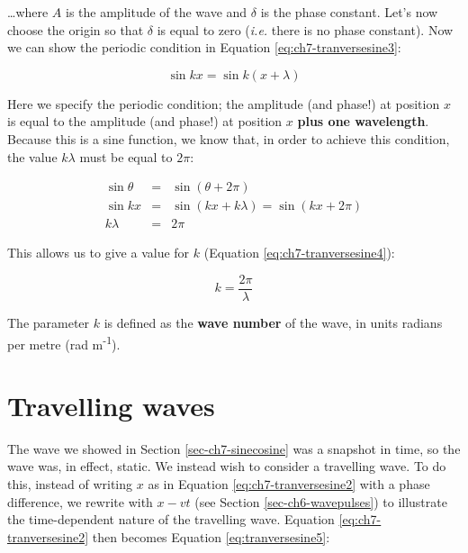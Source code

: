 \documentclass[
]{book}
\begin{document}
\ldots where \(A\) is the amplitude of the wave and \(\delta\) is the phase constant. Let's now choose the origin so that \(\delta\) is equal to zero (\emph{i.e.} there is no phase constant). Now we can show the periodic condition in Equation \eqref{eq:ch7-tranversesine3}:

\begin{equation}
\sin kx = \sin k(x+\lambda)
\label{eq:ch7-tranversesine3}
\end{equation}

Here we specify the periodic condition; the amplitude (and phase!) at position \(x\) is equal to the amplitude (and phase!) at position \(x\) \textbf{plus one wavelength}. Because this is a sine function, we know that, in order to achieve this condition, the value \(k\lambda\) must be equal to \(2\pi\):

\begin{equation}
\begin{array}{rcl}
\sin \theta &=& \sin \left( \theta + 2\pi \right)\\
\sin kx &=& \sin \left( kx + k\lambda\right) = \sin \left( kx + 2\pi \right) \\
k\lambda &=& 2\pi
\end{array}
\label{eq:ch7-tranvsersesine3b}
\end{equation}

This allows us to give a value for \(k\) (Equation \eqref{eq:ch7-tranversesine4}):

\begin{equation}
k = \frac{2\pi}{\lambda}
\label{eq:ch7-tranversesine4}
\end{equation}

The parameter \(k\) is defined as the \textbf{wave number} of the wave, in units radians per metre (rad m\textsuperscript{-1}).

\hypertarget{sec-ch7-travellingwaves}{%
\section{Travelling waves}\label{sec-ch7-travellingwaves}}

The wave we showed in Section \ref{sec-ch7-sinecosine} was a snapshot in time, so the wave was, in effect, static. We instead wish to consider a travelling wave. To do this, instead of writing \(x\) as in Equation \eqref{eq:ch7-tranversesine2} with a phase difference, we rewrite with \(x - vt\) (see Section \ref{sec-ch6-wavepulses}) to illustrate the time-dependent nature of the travelling wave. Equation \eqref{eq:ch7-tranversesine2} then becomes Equation \eqref{eq:tranversesine5}:
\end{document}
